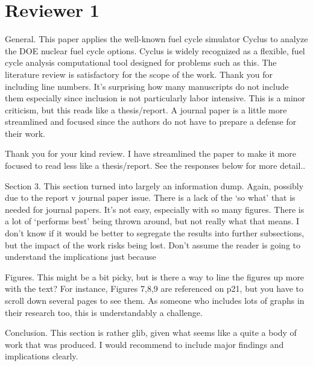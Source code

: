 \documentclass[answers,11pt]{exam}
\begin{document}
\section*{Reviewer 1}
\begin{questions}

\question General. This paper applies the well-known fuel cycle simulator Cyclus to analyze the DOE nuclear
fuel cycle options. Cyclus is widely recognized as a flexible, fuel cycle analysis computational tool designed for problems such as this. The literature review is satisfactory for the scope of the work. Thank
you for including line numbers. It’s surprising how many manuscripts do not include them especially
since inclusion is not particularly labor intensive. This is a minor criticism, but this reads like a thesis/report. A journal paper is a little more streamlined and focused since the authors do not have to
prepare a defense for their work.

\begin{solution}
        Thank you for your kind review.
        I have streamlined the paper to make it more focused to read less like a thesis/report. 
        See the responses below for more detail..
\end{solution}

\question Section 3. This section turned into largely an information dump. Again, possibly due to the report v
journal paper issue. There is a lack of the ‘so what’ that is needed for journal papers. It’s not easy,
especially with so many figures. There is a lot of ‘performs best’ being thrown around, but not really
what that means. I don’t know if it would be better to segregate the results into further subsections, but
the impact of the work risks being lost. Don’t assume the reader is going to understand the implications
just because

\begin{solution}
\end{solution}

\question Figures. This might be a bit picky, but is there a way to line the figures up more with the text? For
instance, Figures 7,8,9 are referenced on p21, but you have to scroll down several pages to see them. As
someone who includes lots of graphs in their research too, this is understandably a challenge.

\begin{solution}
\end{solution}

\question Conclusion. This section is rather glib, given what seems like a quite a body of work that was produced.
I would recommend to include major findings and implications clearly.


\end{questions}
\end{document}
